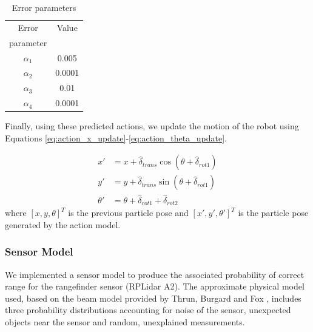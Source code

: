 \documentclass[journal]{IEEEtran}
\begin{document}
            \begin{table}[ht]
            \centering
                \begin{tabular}{|c|c|}          \hline
                     Error & Value              \\
                     parameter &                \\ \hline
                     $\alpha_{1}$ & 0.005       \\ \hline
                     $\alpha_{2}$ & 0.0001      \\ \hline
                     $\alpha_{3}$ & 0.01        \\ \hline
                     $\alpha_{4}$ & 0.0001      \\ \hline
                \end{tabular}
                \caption{Error parameters}
                \label{tab:action_error_params}
            \end{table}
          
            Finally, using these predicted actions, we update the motion of the robot using Equations \ref{eq:action_x_update}-\ref{eq:action_theta_update}.
          
            \begin{align}
                x' &= x + \hat{\delta}_{trans}\cos(\theta + \hat{\delta}_{rot1})  \label{eq:action_x_update} \\
                y' &= y + \hat{\delta}_{trans}\sin(\theta + \hat{\delta}_{rot1})  \label{eq:action_y_update} \\
                \theta' &= \theta + \hat{\delta}_{rot1} + \hat{\delta}_{rot2}  \label{eq:action_theta_update} 
            \end{align}
            where $[x, y, \theta]^{T}$ is the previous particle pose and $[x', y', \theta']^{T}$ is the particle pose generated by the action model. 
            
        
         \subsubsection{Sensor Model}
         \label{ssec:sensor_model}
         
            We implemented a sensor model to produce the associated probability of correct range for the rangefinder sensor (RPLidar A2). The approximate physical model used, based on the beam model provided by Thrun, Burgard and Fox \cite{Prob_Rob}, includes three probability distributions accounting for noise of the sensor, unexpected objects near the sensor and random, unexplained measurements.
            
\end{document}
